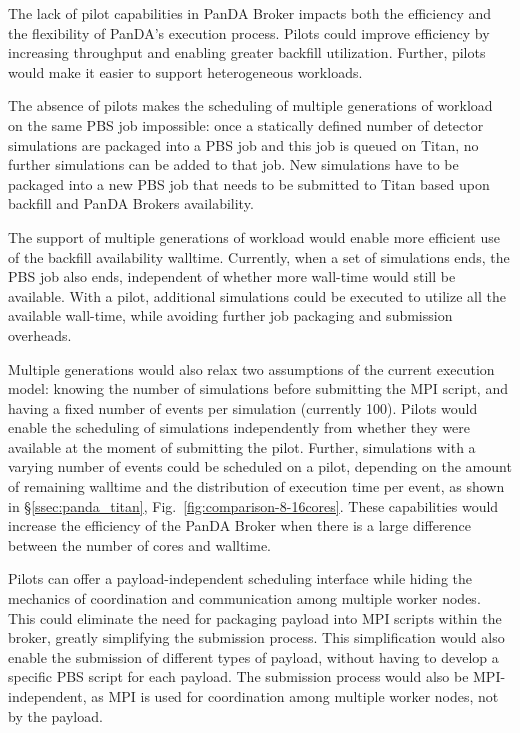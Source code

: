 The lack of pilot capabilities in PanDA Broker impacts both the efficiency
and the flexibility of PanDA's execution process. Pilots could improve
efficiency by increasing throughput and enabling greater backfill
utilization. Further, pilots would make it easier to support heterogeneous
workloads.

The absence of pilots 
makes the scheduling of multiple generations of workload on the same PBS job
impossible: once a statically defined number of detector simulations are
packaged into a PBS job and this job is queued on Titan, no further
simulations can be added to that job. New simulations have to be packaged
into a new PBS job that needs to be submitted to Titan based upon backfill
and PanDA Brokers availability.

The support of multiple generations of workload would enable more efficient
use of the backfill availability walltime. Currently, when a set of
simulations ends, the PBS job also ends, independent of whether more
wall-time would still be available. With a pilot, additional simulations
could be executed to utilize all the available wall-time, while avoiding
further job packaging and submission overheads.

Multiple generations would also relax two assumptions of the current execution
model: knowing the number of simulations before submitting the MPI script, and
having a fixed number of events per simulation (currently 100). Pilots would
enable the scheduling of simulations independently from whether they were
available at the moment of submitting the pilot. Further, simulations with a
varying number of events could be scheduled on a pilot, depending on the
amount of remaining walltime and the distribution of execution time per event,
as shown in \S\ref{ssec:panda_titan}, Fig.~\ref{fig:comparison-8-16cores}.
These capabilities would increase the efficiency of the PanDA Broker when
there is a large difference between the number of cores and walltime.

Pilots can offer a payload-independent scheduling interface while hiding the
mechanics of coordination and communication among multiple worker nodes. This
could eliminate the need for packaging payload into MPI scripts within the
broker, greatly simplifying the submission process. This simplification would
also enable the submission of different types of payload, without having to
develop a specific PBS script for each payload. The submission process would
also be MPI-independent, as MPI is used for coordination among multiple
worker nodes, not by the payload.

